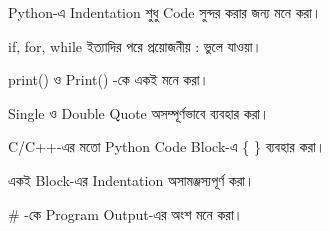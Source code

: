 \begin{compacttwocolpoints}

\item Python-এ Indentation শুধু Code সুন্দর করার জন্য মনে করা।

\item
\textenglish{\ttfamily if},
\textenglish{\ttfamily for},
\textenglish{\ttfamily while}
ইত্যাদির পরে প্রয়োজনীয়
\textenglish{\ttfamily :}
ভুলে যাওয়া।

\item
\textenglish{\ttfamily print()}
ও
\textenglish{\ttfamily Print()}
-কে একই মনে করা।

\item Single ও Double Quote অসম্পূর্ণভাবে ব্যবহার করা।

\item C/C++-এর মতো Python Code Block-এ
\textenglish{\ttfamily \{ \}}
ব্যবহার করা।

\item একই Block-এর Indentation অসামঞ্জস্যপূর্ণ করা।

\item
\textenglish{\ttfamily \#}
-কে Program Output-এর অংশ মনে করা।

\end{compacttwocolpoints}


